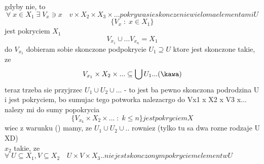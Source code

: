 \documentclass{article}
\begin{document}
gdyby nie, to
$$\forall\;x\in X_1\;\exists\;V_x\ni x\quad v\times X_2\times X_3\times... pokrywa sie skonczenie wieloma elementami U$$
$$\{V_x\;:\;x\in X_1\}$$
jest pokryciem $X_1$
$$V_{x_1}\cup...V_{x_n}=X_1$$
do $V_{x_1}$ dobieram sobie skonczone podpokrycie $U_1\supseteq U$ ktore jest skonczone takie, ze
$$V_{x_1}\times X_2\times... \subseteq \bigcup U_1... (\kawa)$$
teraz trzeba sie przyjrzec $U_1\cup U_2\cup...$ - to jest ba pewno skonczona podrodzina U i jest pokryciem, bo sumujac tego potworka nalezacrgo do Vx1 x X2 x V3 x... nalezy mi do sumy popokrycia
$$\{V_{x_k}\times X_2\times...\;:\;k\leq n\} jest pokryciem X$$
wiec z warunku (\kawa) mamy, ze $U_1\cup U_2\cup..$ rowniez (tylko tu sa dwa rozne rodzaje U XD)\\
$x_2$ takie, ze $\forall\;U\subseteq X_1, V\subseteq X_2 \quad U\times V\times X_3.. nie jest skonczonym pokryciem elementw U$
\end{document}
